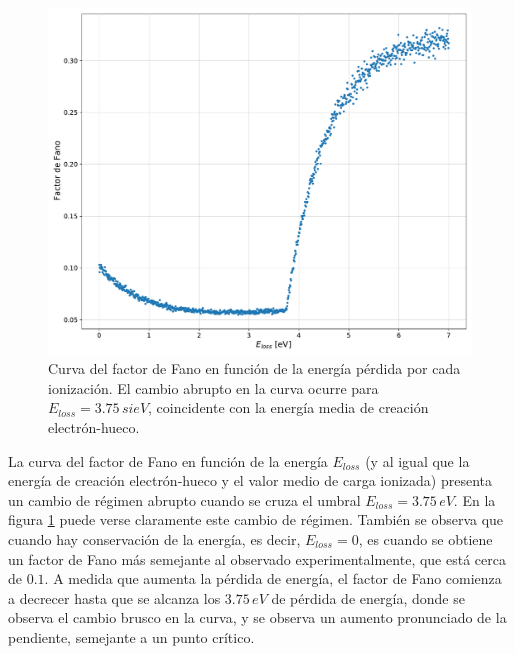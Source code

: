 \begin{figure}%
    \centering
    \includegraphics[scale=0.35]{Figs/Fano_vs_Eloss_5ktrials_0-7Eloss.pdf}
    \caption{\footnotesize{Curva del factor de Fano en función de la energía pérdida por cada ionización. El cambio abrupto en la curva ocurre para $E_{loss} = 3.75\,si{eV}$, coincidente con la energía media de creación electrón-hueco.}}
    \label{fig:FanoVsEloss}
\end{figure}
La curva del factor de Fano en función de la energía $E_{loss}$ (y al igual que la energía de creación electrón-hueco y el valor medio de carga ionizada) presenta un cambio de régimen abrupto cuando se cruza el umbral $E_{loss} = 3.75\,\si{eV}$. En la figura \ref{fig:FanoVsEloss} puede verse claramente este cambio de régimen. También se observa que cuando hay conservación de la energía, es decir, $E_{loss} = 0$, es cuando se obtiene un factor de Fano más semejante al observado experimentalmente, que está cerca de $0.1$. A medida que aumenta la pérdida de energía, el factor de Fano comienza a decrecer hasta que se alcanza los $3.75\,\si{eV}$ de pérdida de energía, donde se observa el cambio brusco en la curva, y se observa un aumento pronunciado de la pendiente, semejante a un punto crítico.\\
